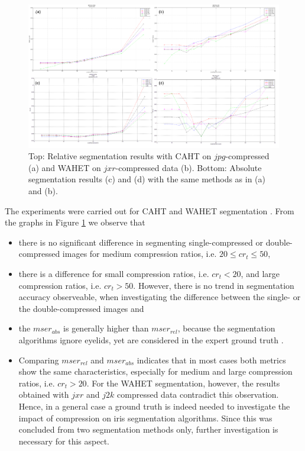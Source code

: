 \documentclass[10pt,twocolumn,letterpaper]{article}
\begin{document}
\begin{figure}[h]
	\begin{center}
		
	\includegraphics[width=\linewidth]{img/segResults}
\end{center}
	\caption{Top: Relative segmentation results with CAHT on $jpg$-compressed (a) and WAHET on $jxr$-compressed data (b). Bottom: Absolute segmentation results (c) and (d) with the same methods as in (a) and (b).}
	\label{fig:segResults}
	
\end{figure}

The experiments were carried out for CAHT and WAHET segmentation \cite{rathgeb}. From the graphs in Figure \ref{fig:segResults} we observe that

\begin{itemize}
 \item there is no significant difference in segmenting single-compressed or double-compressed images for medium compression ratios, i.e. $ 20 \leq cr_t \leq 50 $,
 \item there is a difference for small compression ratios, i.e. $cr_t < 20$, and large compression ratios, i.e. $cr_t > 50$. However, there is no trend in segmentation accuracy observeable, when investigating the difference between the single- or the double-compressed images and%
 \item the $mser_{abs}$ is generally higher than $mser_{rel}$, because the segmentation algorithms ignore eyelids, yet are considered in the expert ground truth \cite{severeCompression}.
 \item Comparing $mser_{rel}$ and $mser_{abs}$ indicates that in most cases both metrics show the same characteristics, especially for medium and large compression ratios, i.e. $cr_t > 20$. For the WAHET segmentation, however, the results obtained with $jxr$ and $j2k$ compressed data contradict this observation. Hence, in a general case a ground truth is indeed needed to investigate the impact of compression on iris segmentation algorithms. Since this was concluded from two segmentation methods only, further investigation is necessary for this aspect.
\end{itemize}
\end{document}
